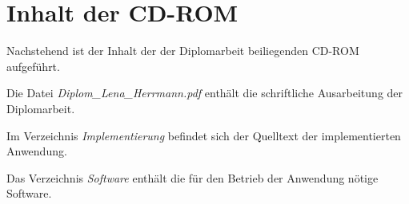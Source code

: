 \section{Inhalt der CD-ROM}

Nachstehend ist der Inhalt der der Diplomarbeit beiliegenden CD-ROM aufgeführt. 

Die Datei \textit{Diplom\_Lena\_Herrmann.pdf} enthält die schriftliche Ausarbeitung der Diplomarbeit. 

Im Verzeichnis \textit{Implementierung} befindet sich der Quelltext der implementierten Anwendung. 

Das Verzeichnis \textit{Software} enthält die für den Betrieb der Anwendung nötige Software. 

